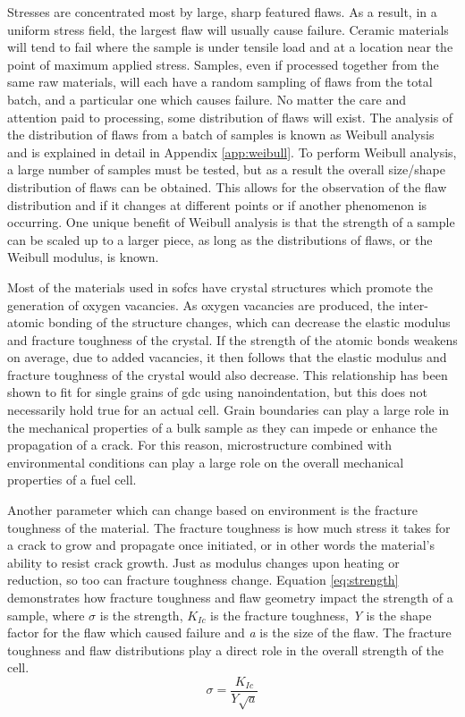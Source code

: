     Stresses are concentrated most by large, sharp featured flaws.
    As a result, in a uniform stress field, the largest flaw will usually cause failure.
    Ceramic materials will tend to fail where the sample is under tensile load and at a location near the point of maximum applied stress.
    Samples, even if processed together from the same raw materials, will each have a random sampling of flaws from the total batch, and a particular one which causes failure.
    No matter the care and attention paid to processing, some distribution of flaws will exist.
    The analysis of the distribution of flaws from a batch of samples is known as Weibull analysis and is explained in detail in Appendix \ref{app:weibull}.
    To perform Weibull analysis, a large number of samples must be tested, but as a result the overall size/shape distribution of flaws can be obtained.
    This allows for the observation of the flaw distribution and if it changes at different points or if another phenomenon is occurring.
    One unique benefit of Weibull analysis is that the strength of a sample can be scaled up to a larger piece, as long as the distributions of flaws, or the Weibull modulus, is known.

    Most of the materials used in \glspl{sofc} have crystal structures which promote the generation of oxygen vacancies.
    As oxygen vacancies are produced, the inter-atomic bonding of the structure changes, which can decrease the elastic modulus and fracture toughness of the crystal.\cite{Bishop2014,Duncan2006}
    If the strength of the atomic bonds weakens on average, due to added vacancies, it then follows that the elastic modulus and fracture toughness of the crystal would also decrease.
    This relationship has been shown to fit for single grains of \gls{gdc} using nanoindentation, but this does not necessarily hold true for an actual cell.\cite{Wang2007}
    Grain boundaries can play a large role in the mechanical properties of a bulk sample as they can impede or enhance the propagation of a crack.
    For this reason, microstructure combined with environmental conditions can play a large role on the overall mechanical properties of a fuel cell.

    Another parameter which can change based on environment is the fracture toughness of the material.
    The fracture toughness is how much stress it takes for a crack to grow and propagate once initiated, or in other words the material's ability to resist crack growth.
    Just as modulus changes upon heating or reduction, so too can fracture toughness change.
    Equation \ref{eq:strength} demonstrates how fracture toughness and flaw geometry impact the strength of a sample, where $\sigma$ is the strength, $K_{Ic}$ is the fracture toughness, \textit{Y} is the shape factor for the flaw which caused failure and \textit{a} is the size of the flaw.\cite{Green1998}
    The fracture toughness and flaw distributions play a direct role in the overall strength of the cell.
    \begin{equation}
        \sigma = \frac{K_{Ic}}{Y\sqrt{a}}
        \label{eq:strength}
    \end{equation}

